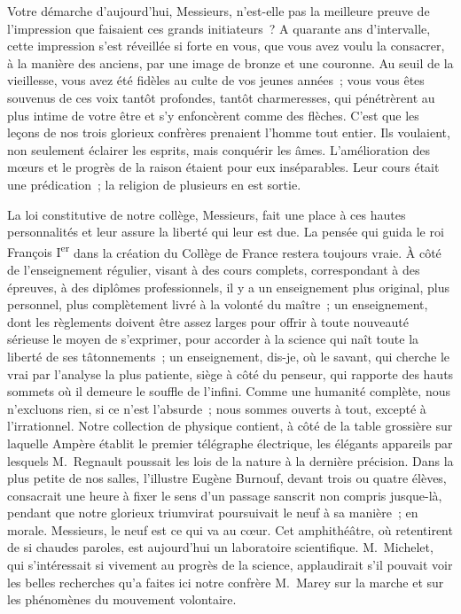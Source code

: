 \documentclass[french,twoside]{book} %
\newcommand\orgName[1]{#1}
\newcommand\persName[1]{#1}
\begin{document}
Votre démarche d’aujourd’hui, Messieurs, n’est-elle pas la meilleure preuve de l’impression que faisaient ces grands initiateurs ? A quarante ans d’intervalle, cette impression s’est réveillée si forte en vous, que vous avez voulu la consacrer, à la manière des anciens, par une image de bronze et une couronne. Au seuil de la vieillesse, vous avez été fidèles au culte de vos jeunes années ; vous vous êtes souvenus de ces voix tantôt profondes, tantôt charmeresses, qui pénétrèrent au plus intime de votre être et s’y enfoncèrent comme des flèches. C’est que les leçons de nos trois glorieux confrères prenaient l’homme tout entier. Ils voulaient, non seulement éclairer les esprits, mais conquérir les âmes. L’amélioration des mœurs et le progrès de la raison étaient pour eux inséparables. Leur cours était une prédication ; la religion de plusieurs en est sortie.\par
La loi constitutive de notre collège, Messieurs, fait une place à ces hautes personnalités et leur assure la liberté qui leur est due. La pensée qui guida le {\persName roi François I\textsuperscript{er}} dans la création du {\orgName Collège de France} restera toujours vraie. À côté de l’enseignement régulier, visant à des cours complets, correspondant à des épreuves, à des diplômes professionnels, il y a un enseignement plus original, plus personnel, plus complètement livré à la volonté du maître ; un enseignement, dont les règlements doivent être assez larges pour offrir à toute nouveauté sérieuse le moyen de s’exprimer, pour accorder à la science qui naît toute la liberté de ses tâtonnements ; un enseignement, dis-je, où le savant, qui cherche le vrai par l’analyse la plus patiente, siège à côté du penseur, qui rapporte des hauts sommets où il demeure le souffle de l’infini. Comme une humanité complète, nous n’excluons rien, si ce n’est l’absurde ; nous sommes ouverts à tout, excepté à l’irrationnel. Notre collection de physique contient, à côté de la table grossière sur laquelle {\persName Ampère} établit le premier télégraphe électrique, les élégants appareils par lesquels {\persName M. Regnault} poussait les lois de la nature à la dernière précision. Dans la plus petite de nos salles, l’illustre {\persName Eugène Burnouf}, devant trois ou quatre élèves, consacrait une heure à fixer le sens d’un passage sanscrit non compris jusque-là, pendant que notre glorieux triumvirat poursuivait le neuf à sa manière ; en morale. Messieurs, le neuf est ce qui va au cœur. Cet amphithéâtre, où retentirent de si chaudes paroles, est aujourd’hui un laboratoire scientifique. {\persName M. Michelet}, qui s’intéressait si vivement au progrès de la science, applaudirait s’il pouvait voir les belles recherches qu’a faites ici notre confrère {\persName M. Marey} sur la marche et sur les phénomènes du mouvement volontaire.\par
\end{document}
